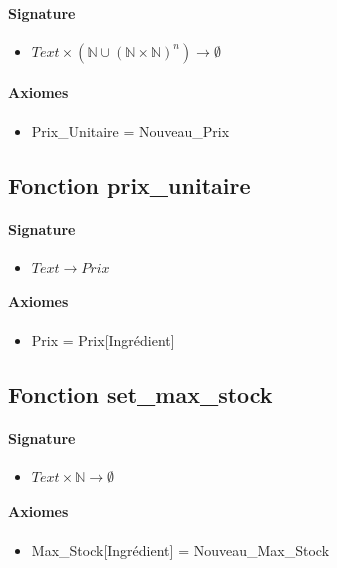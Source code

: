 \documentclass[]{article}
\begin{document}
\paragraph{Signature}
\begin{itemize}
\item
  $  Text \times (\mathbb{N} \cup (\mathbb{N} \times \mathbb{N})^{n}) \longrightarrow \emptyset $
\end{itemize}
\paragraph{Axiomes}
\begin{itemize}
\item
 Prix\_Unitaire = Nouveau\_Prix
\end{itemize}

\subsection*{Fonction prix\_unitaire}
\paragraph{Signature}
\begin{itemize}
\item
  $  Text \longrightarrow Prix $
\end{itemize}
\paragraph{Axiomes}
\begin{itemize}
\item
  Prix = Prix{[}Ingrédient{]}
\end{itemize}

\subsection*{Fonction set\_max\_stock}
\paragraph{Signature}
\begin{itemize}
\item
  $  Text \times \mathbb{N} \longrightarrow \emptyset $
\end{itemize}
\paragraph{Axiomes}
\begin{itemize}
\item
  Max\_Stock{[}Ingrédient{]} = Nouveau\_Max\_Stock
\end{itemize}
\end{document}
